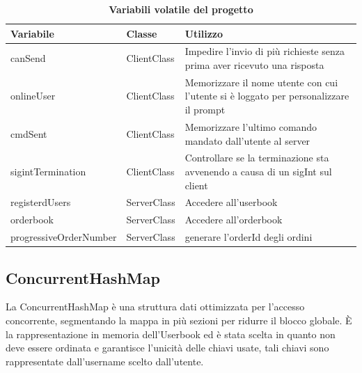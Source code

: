 \documentclass{article}
\begin{document}
\begin{table}[h]
  \captionsetup{justification=raggedright, singlelinecheck=false}
  \caption*{\textbf{Variabili volatile del progetto}}
  \center
  \begin{tabular}{|p{4cm}|p{2cm}|p{7.4cm}|}
    \hline
    \textbf{Variabile} & \textbf{Classe} & \textbf{Utilizzo} \\
    \hline
    \centering canSend   & ClientClass   & Impedire l'invio di più richieste senza prima aver ricevuto una risposta\\
    \hline
    \centering onlineUser   & ClientClass   & Memorizzare il nome utente con cui l'utente si è loggato per personalizzare il prompt\\
    \hline
    \centering cmdSent   & ClientClass   & Memorizzare l'ultimo comando mandato dall'utente al server \\
    \hline
    \centering sigintTermination & ClientClass & Controllare se la terminazione sta avvenendo a causa di un sigInt sul client\\
    \hline
    \centering registerdUsers & ServerClass & Accedere all'userbook\\
    \hline
    \centering orderbook & ServerClass & Accedere all'orderbook\\
    \hline
    \centering progressiveOrderNumber & ServerClass & generare l'orderId degli ordini\\
    \hline
  \end{tabular}
\end{table}

\subsection{ConcurrentHashMap}
La ConcurrentHashMap è una struttura dati ottimizzata per l'accesso concorrente, segmentando la mappa in più 
sezioni per ridurre il blocco globale. È la rappresentazione in memoria dell'Userbook ed è stata scelta in quanto 
non deve essere ordinata e garantisce l'unicità delle chiavi usate, tali chiavi sono rappresentate dall'username scelto dall'utente.
\end{document}
